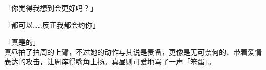 「你觉得我想到会更好吗？」

「都可以……反正我都会约你」

「真是的」\\

真昼拍了拍周的上臂，不过她的动作与其说是责备，更像是无可奈何的、带着爱情表达的攻击，让周痒得嘴角上扬。真昼则可爱地骂了一声「笨蛋」。\\

